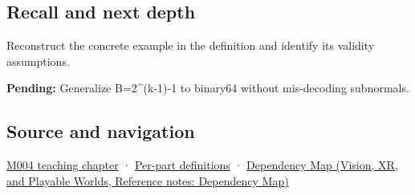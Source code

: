 \subsection{Recall and next depth}\label{appendix-2fae058c82e1-recall-and-next-depth}

Reconstruct the concrete example in the definition and identify its validity assumptions.

\textbf{Pending:} Generalize B=2\^{}(k-1)-1 to binary64 without mis-decoding subnormals.

\subsection{Source and navigation}\label{appendix-2fae058c82e1-source-and-navigation}

\hyperref[01-foundations-i-ch001-a-stretching-ruler-for-real-valued-quantities]{M004 teaching chapter} · \hyperref[appendix-fd090d982a15-m004---parts-61-76]{Per-part definitions} · \href{../07-Vision-XR-and-Playable-Worlds/main.pdf\#nameddest=appendix-4ad47bdd269a}{Dependency Map (Vision, XR, and Playable Worlds, Reference notes: Dependency Map)}
